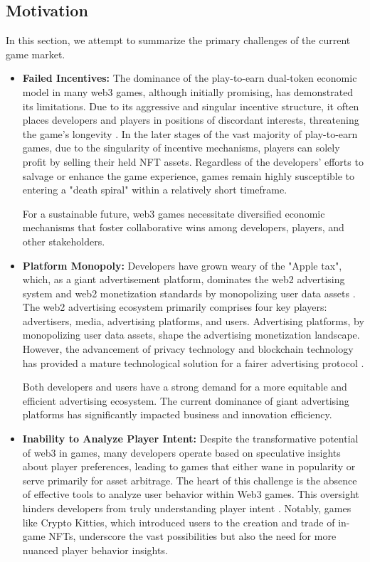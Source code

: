 \subsection{Motivation}
In this section, we attempt to summarize the primary challenges of the current game market.
\begin{itemize}[leftmargin=*]
    \item \textbf{Failed Incentives:} The dominance of the play-to-earn dual-token economic model in many web3 games, although initially promising, has demonstrated its limitations. Due to its aggressive and singular incentive structure, it often places developers and players in positions of discordant interests, threatening the game’s longevity \cite{leonardos2020oceanic}. In the later stages of the vast majority of play-to-earn games, due to the singularity of incentive mechanisms, players can solely profit by selling their held NFT assets. Regardless of the developers’ efforts to salvage or enhance the game experience, games remain highly susceptible to entering a "death spiral" within a relatively short timeframe. 
    
    For a sustainable future, web3 games necessitate diversified economic mechanisms that foster collaborative wins among developers, players, and other stakeholders.
    
    \item \textbf{Platform Monopoly:} Developers have grown weary of the "Apple tax", which, as a giant advertisement platform, dominates the web2 advertising system and web2 monetization standards by monopolizing user data assets \cite{hovenkamp2020antitrust}. The web2 advertising ecosystem primarily comprises four key players: advertisers, media, advertising platforms, and users. Advertising platforms, by monopolizing user data assets, shape the advertising monetization landscape. However, the advancement of privacy technology and blockchain technology has provided a mature technological solution for a fairer advertising protocol \cite{stallone2023enhancing}.
 
    Both developers and users have a strong demand for a more equitable and efficient advertising ecosystem. The current dominance of giant advertising platforms has significantly impacted business and innovation efficiency.

    \item \textbf{Inability to Analyze Player Intent:} Despite the transformative potential of web3 in games, many developers operate based on speculative insights about player preferences, leading to games that either wane in popularity or serve primarily for asset arbitrage. The heart of this challenge is the absence of effective tools to analyze user behavior within Web3 games. This oversight hinders developers from truly understanding player intent \cite{abeele2020development}. Notably, games like Crypto Kitties, which introduced users to the creation and trade of in-game NFTs, underscore the vast possibilities but also the need for more nuanced player behavior insights.


\end{itemize}
